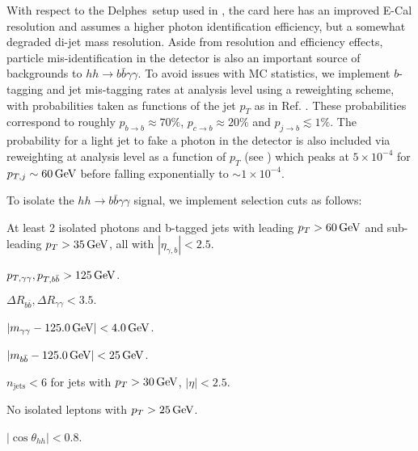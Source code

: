 With respect to the {\sc\small Delphes}\ setup used in \cite{Homiller:2018dgu}, the card here has an improved E-Cal resolution and assumes a higher photon identification efficiency, but a somewhat degraded di-jet mass resolution. Aside from resolution and efficiency effects, particle mis-identification in the detector is also an important source of backgrounds to $hh\rightarrow b\bar{b}\gamma\gamma$. To avoid issues with MC statistics, we implement $b$-tagging and jet mis-tagging rates at analysis level using a reweighting scheme, with probabilities taken as functions of the jet $p_T$ as in Ref. \cite{Homiller:2018dgu}. These probabilities correspond to roughly $p_{b\rightarrow b} \approx 70\%$, $p_{c\rightarrow b} \approx 20\%$ and $p_{j\rightarrow b} \lesssim 1\%$. The probability for a light jet to fake a photon in the detector is also included via reweighting at analysis level as a function of $p_T$ (see \cite{Homiller:2018dgu}) which peaks at $5\times 10^{-4}$ for $p_{T,j} \sim 60\, {\rm \text{GeV}}$ before falling exponentially to $\sim 1\times 10^{-4}$.



To isolate the $hh \rightarrow b\bar{b}\gamma\gamma$ signal, we implement selection cuts as follows:
\begin{itemize}
\setlength\itemsep{0.25em}
  \item At least 2 isolated photons and b-tagged jets with leading $p_T > 60\, {\rm \text{GeV}}$ and sub-leading $p_T > 35\, {\rm \text{GeV}}$, all with $|\eta_{\gamma,b}| < 2.5$.
  
\begin{minipage}{0.49\textwidth}
  \item $p_{T,\gamma\gamma}, p_{T,b\bar{b}} > 125\, {\rm \text{GeV}}$.
  \item $\Delta R_{b\bar{b}}, \Delta R_{\gamma\gamma} < 3.5.$
  \item $|m_{\gamma\gamma} - 125.0\, {\rm \text{GeV}}| < 4.0\, {\rm \text{GeV}}$.
  \item $|m_{b\bar{b}} - 125.0\, {\rm \text{GeV}}| < 25\, {\rm \text{GeV}}$.
\end{minipage}
\begin{minipage}{0.49\textwidth}
  \item $n_{\text{jets}} < 6$ for jets with $p_T > 30\, {\rm \text{GeV}}$, $|\eta| < 2.5$.
  \item No isolated leptons with $p_T > 25\, {\rm \text{GeV}}$.
  \item $|\cos\theta_{hh}| < 0.8$.
\end{minipage}
\end{itemize}

